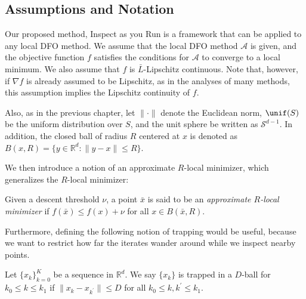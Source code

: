 \subsection{Assumptions and Notation}
Our proposed method, Inspect as you Run is a framework that can be applied to any local DFO method. We assume that the local DFO method $\mathcal{A}$ is given,
and the objective function $f$ satisfies the conditions for $\mathcal{A}$ to converge to a local minimum.
We also assume that $f$ is $\bar{L}$-Lipschitz continuous. Note that, however, if $\nabla f$ is already assumed to be Lipschitz, as in the analyses of many methods, this assumption implies the Lipschitz continuity of $f$.

Also, as in the previous chapter, let $\| \cdot \|$ denote the Euclidean norm, $\unif(S)$ be the uniform distribution over $S$, and the unit sphere be written as $\mathcal{S}^{d-1}$. In addition, the closed ball of radius $R$ centered at $x$ is denoted as $B(x, R) = \{y \in \mathbb{R}^d : \|y - x\| \leq R\}$.

We then introduce a notion of an approximate $R$-local minimizer, which generalizes the $R$-local minimizer:
\begin{definition} \label{def: approximate R-local minimizer}
    Given a descent threshold $\nu$, a point $\bar{x}$ is said to be an \emph{approximate $R$-local minimizer} if $f(\bar{x}) \leq f(x) + \nu$ for all $x \in B(\bar{x}, R)$.    
\end{definition}

Furthermore, defining the following notion of trapping would be useful, because we want to restrict how far the iterates wander around while we inspect nearby points.
\begin{definition}
    Let $\{x_k\}_{k=0}^{K}$ be a sequence in $\mathbb{R}^d$. We say $\{x_k\}$ is trapped in a $D$-ball for $k_0 \leq k \leq k_1$ if $\|x_{k} - x_{k^{\prime}}\| \leq D$ for all $k_0 \leq k, k^{\prime} \leq k_1$.
\end{definition}

